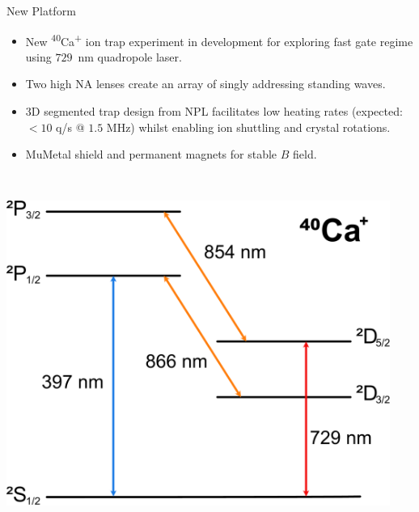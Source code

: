 \documentclass[final]{beamer}
\begin{document}
\begin{frame}{}
\begin{center}
\begin{columns}[t]
\begin{column}{0.49\textwidth}
    \begin{alertblock}{New Platform}
      \begin{minipage}{0.58\textwidth}
      \begin{itemize}
      \item New \textsuperscript{40}Ca\textsuperscript{+} ion trap experiment in development for exploring fast
        gate regime using $729$~nm quadropole laser.
      \item Two high NA lenses create an array of singly
        addressing standing waves.
      \item 3D segmented trap design from NPL facilitates low heating
        rates (expected: $<10$ q/s @ $1.5$ MHz) whilst enabling ion shuttling and crystal rotations.
      \item MuMetal shield and permanent magnets for stable $B$ field.
      \end{itemize}
      \end{minipage}
      ~~
      \begin{minipage}{0.35\textwidth}
      \includegraphics[width=0.94\textwidth]{./figs/calcium_struct.pdf}
      \end{minipage}


\end{alertblock}
\end{column}
\end{columns}
\end{center}
\end{frame}
\end{document}
